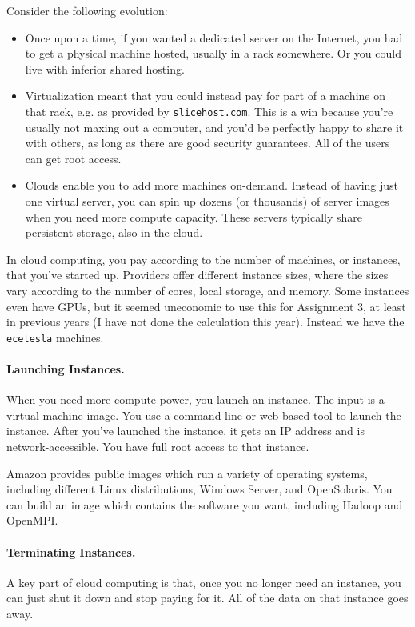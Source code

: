 Consider the following evolution:
\begin{itemize}
\item Once upon a time, if you wanted a dedicated server on the
  Internet, you had to get a physical machine hosted, usually in a
  rack somewhere. Or you could live with inferior shared hosting.
\item Virtualization meant that you could instead pay for part of a
  machine on that rack, e.g. as provided by {\tt slicehost.com}.  This
  is a win because you're usually not maxing out a computer, and you'd
  be perfectly happy to share it with others, as long as there are
  good security guarantees. All of the users can get root access.
\item Clouds enable you to add more machines on-demand. Instead of
  having just one virtual server, you can spin up dozens (or
  thousands) of server images when you need more compute
  capacity. These servers typically share persistent storage, also in
  the cloud. 
\end{itemize}

In cloud computing, you pay according to the number of machines, or
instances, that you've started up. Providers offer different instance
sizes, where the sizes vary according to the number of cores, local
storage, and memory. Some instances even have GPUs, but it seemed 
uneconomic to use this for Assignment 3, at least in previous years (I
have not done the calculation this year). 
Instead we have the {\tt ecetesla} machines.

\paragraph{Launching Instances.} When you need more compute power,
you launch an instance. The input is a virtual machine image.  You use
a command-line or web-based tool to launch the instance.  After you've
launched the instance, it gets an IP address and is
network-accessible. You have full root access to that instance.

Amazon provides public images which run a variety of operating
systems, including different Linux distributions, Windows Server, and
OpenSolaris. You can build an image which contains the software you
want, including Hadoop and OpenMPI.

\paragraph{Terminating Instances.} A key part of cloud computing is
that, once you no longer need an instance, you can just shut it down
and stop paying for it. All of the data on that instance goes away.

